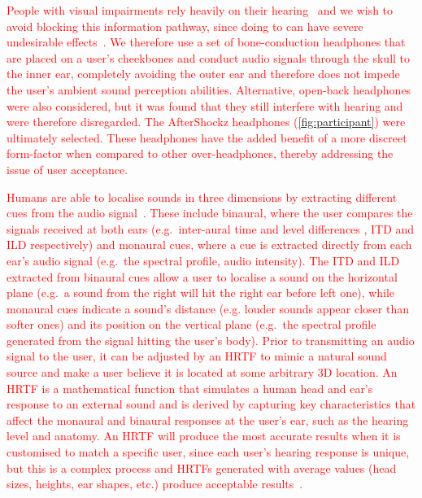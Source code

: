 \documentclass[acmsmall]{acmart}
\newcommand\hl[1]{\textcolor{red}{#1}}
\begin{document}
\hl{People with visual impairments rely heavily on their hearing~\citep{golledge2004stated} and we wish to avoid blocking this information pathway, since doing to can have severe undesirable effects~\citep{lichtenstein2012headphone}.
We therefore use a set of bone-conduction headphones that are placed on a user's cheekbones and conduct audio signals through the skull to the inner ear, completely avoiding the outer ear and therefore does not impede the user's ambient sound perception abilities. 
Alternative, open-back headphones were also considered, but it was found that they still interfere with hearing and were therefore disregarded.
The AfterShockz headphones (\cref{fig:participant}) were ultimately selected.
These headphones have the added benefit of a more discreet form-factor when compared to other over-headphones, thereby addressing the issue of user acceptance.}


\hl{Humans are able to localise sounds in three dimensions by extracting different cues from the audio signal~\citep{blauert1969sound,blauert1997spatial}.
These include binaural, where the user compares the signals received at both ears (e.g.\ inter-aural time and level differences , ITD and ILD respectively) and monaural cues, where a cue is extracted directly from each ear's audio signal (e.g.\ the spectral profile, audio intensity).
The ITD and ILD extracted from binaural cues allow a user to localise a sound on the horizontal plane (e.g.\ a sound from the right will hit the right ear before left one), while monaural cues indicate a sound's distance (e.g. louder sounds appear closer than softer ones) and its position on the vertical plane (e.g.\ the spectral profile generated from the signal hitting the user's body).
Prior to transmitting an audio signal to the user, it can be adjusted by an HRTF to mimic a natural sound source and make a user believe it is located at some arbitrary 3D location. 
An HRTF is a mathematical function that simulates a human head and ear's response to an external sound and is derived by capturing key characteristics that affect the monaural and binaural responses at the user's ear, such as the hearing level and anatomy. 
An HRTF will produce the most accurate results when it is customised to match a specific user, since each user's hearing response is unique, but this is a complex process and HRTFs generated with average values (head sizes, heights, ear shapes, etc.) produce acceptable results~\citep{gardner1995hrtf}.}
\end{document}
